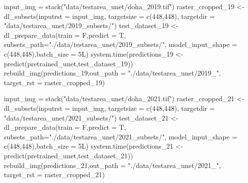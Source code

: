 \documentclass[
]{article}
\newenvironment{Shaded}{\begin{snugshade}}{\end{snugshade}}
\newcommand{\AttributeTok}[1]{\textcolor[rgb]{0.77,0.63,0.00}{#1}}
\newcommand{\DecValTok}[1]{\textcolor[rgb]{0.00,0.00,0.81}{#1}}
\newcommand{\FunctionTok}[1]{\textcolor[rgb]{0.00,0.00,0.00}{#1}}
\newcommand{\NormalTok}[1]{#1}
\newcommand{\OtherTok}[1]{\textcolor[rgb]{0.56,0.35,0.01}{#1}}
\newcommand{\StringTok}[1]{\textcolor[rgb]{0.31,0.60,0.02}{#1}}
\begin{document}
\begin{Shaded}
\begin{Highlighting}[]
\NormalTok{input\_img }\OtherTok{=} \FunctionTok{stack}\NormalTok{(}\StringTok{"data/testarea\_unet/doha\_2019.tif"}\NormalTok{)}
\NormalTok{raster\_cropped\_19 }\OtherTok{\textless{}{-}} \FunctionTok{dl\_subsets}\NormalTok{(}\AttributeTok{inputrst =}\NormalTok{ input\_img, }\AttributeTok{targetsize =} \FunctionTok{c}\NormalTok{(}\DecValTok{448}\NormalTok{,}\DecValTok{448}\NormalTok{), }
                                \AttributeTok{targetdir =} \StringTok{"data/testarea\_unet/2019\_subsets/"}\NormalTok{)}
\NormalTok{test\_dataset\_19 }\OtherTok{\textless{}{-}} \FunctionTok{dl\_prepare\_data}\NormalTok{(}\AttributeTok{train =}\NormalTok{ F,}\AttributeTok{predict =}\NormalTok{ T,}
                                   \AttributeTok{subsets\_path=}\StringTok{"./data/testarea\_unet/2019\_subsets/"}\NormalTok{,}
                                   \AttributeTok{model\_input\_shape =} \FunctionTok{c}\NormalTok{(}\DecValTok{448}\NormalTok{,}\DecValTok{448}\NormalTok{),}\AttributeTok{batch\_size =}\NormalTok{ 5L)}
\FunctionTok{system.time}\NormalTok{(predictions\_19 }\OtherTok{\textless{}{-}} \FunctionTok{predict}\NormalTok{(pretrained\_unet,test\_dataset\_19))}
\FunctionTok{rebuild\_img}\NormalTok{(predictions\_19,}\AttributeTok{out\_path =} \StringTok{"./data/testarea\_unet/2019\_"}\NormalTok{,}
            \AttributeTok{target\_rst =}\NormalTok{ raster\_cropped\_19)}
\end{Highlighting}
\end{Shaded}

\begin{Shaded}
\begin{Highlighting}[]
\NormalTok{input\_img }\OtherTok{=} \FunctionTok{stack}\NormalTok{(}\StringTok{"data/testarea\_unet/doha\_2021.tif"}\NormalTok{)}
\NormalTok{raster\_cropped\_21 }\OtherTok{\textless{}{-}} \FunctionTok{dl\_subsets}\NormalTok{(}\AttributeTok{inputrst =}\NormalTok{ input\_img, }\AttributeTok{targetsize =} \FunctionTok{c}\NormalTok{(}\DecValTok{448}\NormalTok{,}\DecValTok{448}\NormalTok{), }
                                \AttributeTok{targetdir =} \StringTok{"data/testarea\_unet/2021\_subsets/"}\NormalTok{)}
\NormalTok{test\_dataset\_21 }\OtherTok{\textless{}{-}} \FunctionTok{dl\_prepare\_data}\NormalTok{(}\AttributeTok{train =}\NormalTok{ F,}\AttributeTok{predict =}\NormalTok{ T,}
                                   \AttributeTok{subsets\_path=}\StringTok{"./data/testarea\_unet/2021\_subsets/"}\NormalTok{,}
                                   \AttributeTok{model\_input\_shape =} \FunctionTok{c}\NormalTok{(}\DecValTok{448}\NormalTok{,}\DecValTok{448}\NormalTok{),}\AttributeTok{batch\_size =}\NormalTok{ 5L)}
\FunctionTok{system.time}\NormalTok{(predictions\_21 }\OtherTok{\textless{}{-}} \FunctionTok{predict}\NormalTok{(pretrained\_unet,test\_dataset\_21))}
\FunctionTok{rebuild\_img}\NormalTok{(predictions\_21,}\AttributeTok{out\_path =} \StringTok{"./data/testarea\_unet/2021\_"}\NormalTok{,}
            \AttributeTok{target\_rst =}\NormalTok{ raster\_cropped\_21)}
\end{Highlighting}
\end{Shaded}
\end{document}
